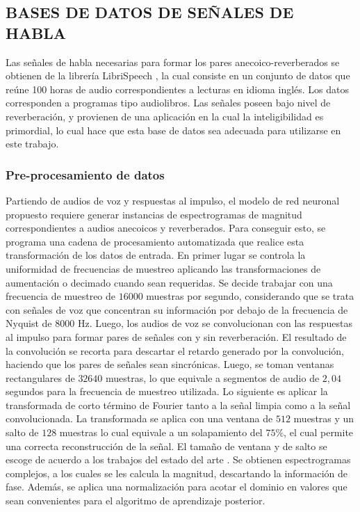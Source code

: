 \subsection[Bases de datos de señales de habla]{BASES DE DATOS DE SEÑALES DE HABLA}

Las señales de habla necesarias para formar los pares anecoico-reverberados se obtienen de la librería LibriSpeech \cite{librispeech}, la cual consiste en un conjunto de datos que reúne 100 horas de audio correspondientes a lecturas en idioma inglés. Los datos corresponden a programas tipo audiolibros. Las señales poseen bajo nivel de reverberación, y provienen de una aplicación en la cual la inteligibilidad es primordial, lo cual hace que esta base de datos sea adecuada para utilizarse en este trabajo.

\subsubsection{Pre-procesamiento de datos}

Partiendo de audios de voz y respuestas al impulso, el modelo de red neuronal propuesto requiere generar instancias de espectrogramas de magnitud correspondientes a audios anecoicos y reverberados. Para conseguir esto, se programa una cadena de procesamiento automatizada que realice esta transformación de los datos de entrada. 
En primer lugar se controla la uniformidad de frecuencias de muestreo aplicando las transformaciones de aumentación o decimado cuando sean requeridas. Se decide trabajar con una frecuencia de muestreo de $16000$ muestras por segundo, considerando que se trata con señales de voz que concentran su información por debajo de la frecuencia de Nyquist de $8000$ Hz. 
Luego, los audios de voz se convolucionan con las respuestas al impulso para formar pares de señales con y sin reverberación. El resultado de la convolución se recorta para descartar el retardo generado por la convolución, haciendo que los pares de señales sean sincrónicas. Luego, se toman ventanas rectangulares de $32640$ muestras, lo que equivale a segmentos de audio de $2,04$ segundos para la frecuencia de muestreo utilizada. Lo siguiente es aplicar la transformada de corto término de Fourier tanto a la señal limpia como a la señal convolucionada. La transformada se aplica con una ventana de $512$ muestras y un salto de $128$ muestras lo cual equivale a un solapamiento del $75\%$, el cual permite una correcta reconstrucción de la señal. El tamaño de ventana y de salto se escoge de acuerdo a los trabajos del estado del arte \cite{rir_filtinverso, FCN}. Se obtienen espectrogramas complejos, a los cuales se les calcula la magnitud, descartando la información de fase. Además, se aplica una normalización para acotar el dominio en valores que sean convenientes para el algoritmo de  aprendizaje posterior. 

